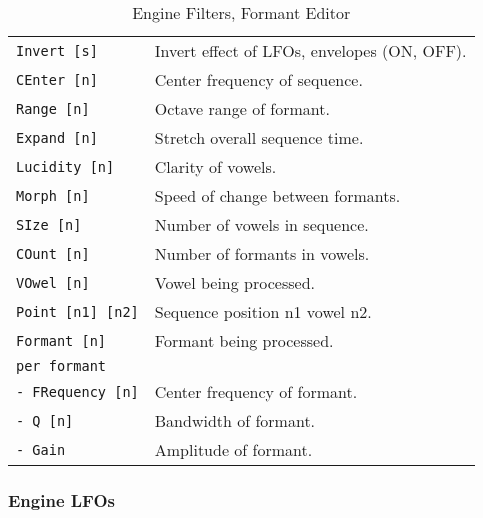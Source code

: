    \begin{table}[H]
      \centering
      \caption{Engine Filters, Formant Editor}
      \label{table:yoshimi_engine_filters_formant_editor}
      \begin{tabular}{l l}

\texttt{Invert [s]} &
   Invert effect of LFOs, envelopes (ON, OFF). \\
\texttt{CEnter [n]} &
   Center frequency of sequence. \\
\texttt{Range [n]} &
   Octave range of formant. \\
\texttt{Expand [n]} &
   Stretch overall sequence time. \\
\texttt{Lucidity [n]} &
   Clarity of vowels. \\
\texttt{Morph [n]} &
   Speed of change between formants. \\
\texttt{SIze [n]} &
   Number of vowels in sequence. \\
\texttt{COunt [n]} &
   Number of formants in vowels. \\
\texttt{VOwel [n]} &
   Vowel being processed. \\
\texttt{Point [n1] [n2]} &
   Sequence position n1 vowel n2. \\
\texttt{Formant [n]} &
   Formant being processed. \\
\texttt{per formant} &
    \\
\texttt{-  FRequency [n]} &
   Center frequency of formant. \\
\texttt{-  Q [n]} &
   Bandwidth of formant. \\
\texttt{-  Gain} &
   Amplitude of formant. \\
      \end{tabular}
   \end{table}

\subsubsection{Engine LFOs}
\label{subsec:command_line_engine_lfos}

